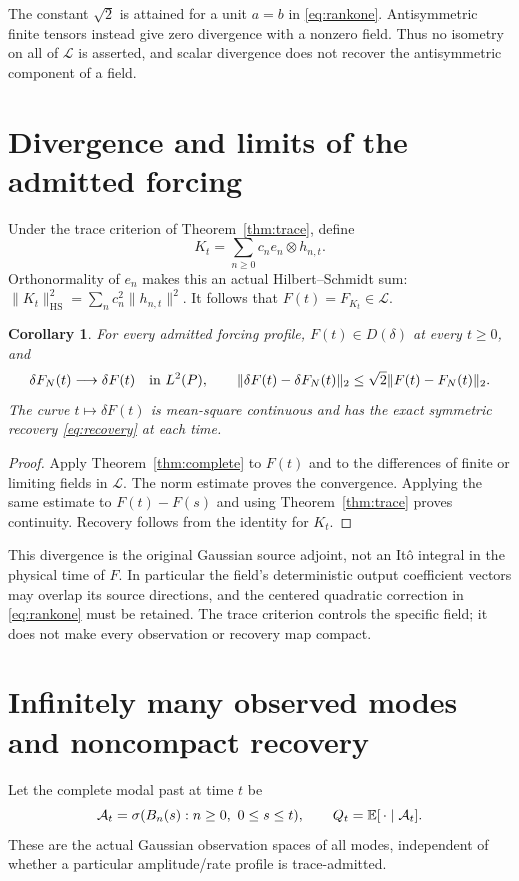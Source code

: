 \documentclass[11pt]{article}
\newtheorem{corollary}[theorem]{Corollary}
\begin{document}
The constant $\sqrt2$ is attained for a unit $a=b$ in
\eqref{eq:rankone}. Antisymmetric finite tensors instead give zero
divergence with a nonzero field. Thus no isometry on all of
$\mathcal L$ is asserted, and scalar divergence does not recover the
antisymmetric component of a field.

\section{Divergence and limits of the admitted forcing}
Under the trace criterion of Theorem~\ref{thm:trace}, define
\[
 K_t=\sum_{n\geq0}c_ne_n\otimes h_{n,t}.
\]
Orthonormality of $e_n$ makes this an actual Hilbert--Schmidt sum:
$\|K_t\|_{\mathrm{HS}}^2=\sum_n c_n^2\|h_{n,t}\|^2$.
It follows that $F(t)=F_{K_t}\in\mathcal L$.

\begin{corollary}\label{cor:forcing}
For every admitted forcing profile, $F(t)\in D(\delta)$ at every
$t\geq0$, and
\[
 \delta F_N(t)\longrightarrow\delta F(t)\quad\hbox{in }L^2(P),
 \qquad \|\delta F(t)-\delta F_N(t)\|_2
          \leq\sqrt2\|F(t)-F_N(t)\|_2.
\]
The curve $t\mapsto\delta F(t)$ is mean-square continuous and has the
exact symmetric recovery \eqref{eq:recovery} at each time.
\end{corollary}
\begin{proof}
Apply Theorem~\ref{thm:complete} to $F(t)$ and to the differences of
finite or limiting fields in $\mathcal L$. The norm estimate proves
the convergence. Applying the same estimate to $F(t)-F(s)$ and using
Theorem~\ref{thm:trace} proves continuity. Recovery follows from the
identity for $K_t$.
\end{proof}

This divergence is the original Gaussian source adjoint, not an It\^o
integral in the physical time of $F$. In particular the field's
deterministic output coefficient vectors may overlap its source
directions, and the centered quadratic correction in
\eqref{eq:rankone} must be retained. The trace criterion controls the
specific field; it does not make every observation or recovery map
compact.

\section{Infinitely many observed modes and noncompact recovery}
Let the complete modal past at time $t$ be
\[
 \mathcal A_t=\sigma(B_n(s):n\geq0,\ 0\leq s\leq t),\qquad
 Q_t=\E[\,\cdot\mid\mathcal A_t].
\]
These are the actual Gaussian observation spaces of all modes,
independent of whether a particular amplitude/rate profile is
trace-admitted.
\end{document}
